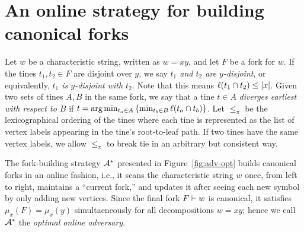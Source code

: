 \section{An online strategy for building canonical forks}
	Let $w$ be a characteristic string, 
	written as $w = xy$, and 
	let $F$ be a fork for $w$. 
	If the tines $t_1, t_2 \in F$ are disjoint over $y$, 
	we say \emph{$t_1$ and $t_2$ are $y$-disjoint}, or equivalently, 
	\emph{$t_1$ is $y$-disjoint with $t_2$}. 
	Note that this means $\ell(t_1 \cap t_2) \leq |x|$. 
	Given two sets of tines $A, B$ in the same fork, 
	we say that a tine $t \in A$ \emph{diverges earliest with respect to $B$} if 
	$t = \arg \min_{t_a \in A}\left\{ \min_{t_b \in B} \ell(t_a \cap t_b) \right\}$.	
	Let $\leq_\pi$ be the lexicographical ordering of the tines where 
	each tine is represented as the list of vertex labels appearing in the tine's root-to-leaf path.
	If two tines have the same vertex labels, 
	we allow $\leq_\pi$ to break tie in an arbitrary but consistent way. 

	The fork-building strategy $\mathcal{A}^*$ presented in Figure~\ref{fig:adv-opt} 
	builds canonical forks in an online fashion, i.e., 
	it scans the characteristic string $w$ once, from left to right, 
	maintains a ``current fork,'' 
	and updates it after seeing each new symbol by only adding new vertices. 
	Since the final fork $F \vdash w$ is canonical, 
	it satisfies $\mu_x(F) = \mu_x(y)$ simultaeneously for all decompositions $w = xy$; 
	hence we call $\mathcal{A}^*$ the \emph{optimal online adversary}. 








